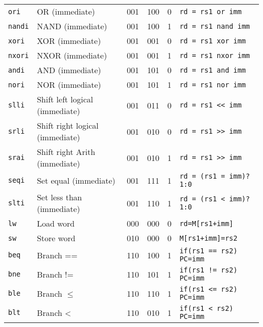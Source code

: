 \documentclass[a4paper]{article}
\begin{document}
\begin{longtable}{|l|l|c|c|c|l|}
        \texttt{ori}   & OR (immediate)                  & 001    & 100    & 0      & \texttt{rd = rs1 or imm}      \\
        \texttt{nandi} & NAND (immediate)                & 001    & 100    & 1      & \texttt{rd = rs1 nand imm}    \\
        \texttt{xori}  & XOR (immediate)                 & 001    & 001    & 0      & \texttt{rd = rs1 xor imm}     \\
        \texttt{nxori} & NXOR (immediate)                & 001    & 001    & 1      & \texttt{rd = rs1 nxor imm}    \\
        \texttt{andi}  & AND (immediate)                 & 001    & 101    & 0      & \texttt{rd = rs1 and imm}     \\
        \texttt{nori}  & NOR (immediate)                 & 001    & 101    & 1      & \texttt{rd = rs1 nor imm}     \\
        \texttt{slli}  & Shift left logical (immediate)  & 001    & 011    & 0      & \texttt{rd = rs1 << imm}      \\
        \texttt{srli}  & Shift right logical (immediate) & 001    & 010    & 0      & \texttt{rd = rs1 >> imm}      \\
        \texttt{srai}  & Shift right Arith (immediate)   & 001    & 010    & 1      & \texttt{rd = rs1 >> imm}      \\
        \texttt{seqi}  & Set equal (immediate)           & 001    & 111    & 1      & \texttt{rd = (rs1 = imm)?1:0} \\
        \texttt{slti}  & Set less than (immediate)       & 001    & 110    & 1      & \texttt{rd = (rs1 < imm)?1:0} \\
        \hline
        \texttt{lw}    & Load word                       & 000    & 000    & 0      & \texttt{rd=M[rs1+imm]}        \\
        \texttt{sw}    & Store word                      & 010    & 000    & 0      & \texttt{M[rs1+imm]=rs2}       \\
        \hline
        \texttt{beq}   & Branch ==                       & 110    & 100    & 1      & \texttt{if(rs1 == rs2) PC=imm}\\
        \texttt{bne}   & Branch !=                       & 110    & 101    & 1      & \texttt{if(rs1 != rs2) PC=imm}\\
        \texttt{ble}   & Branch \(\leqslant\)            & 110    & 110    & 1      & \texttt{if(rs1 <= rs2) PC=imm}\\
        \texttt{blt}   & Branch <                        & 110    & 010    & 1      & \texttt{if(rs1 < rs2) PC=imm} \\

\end{longtable}
\end{document}

